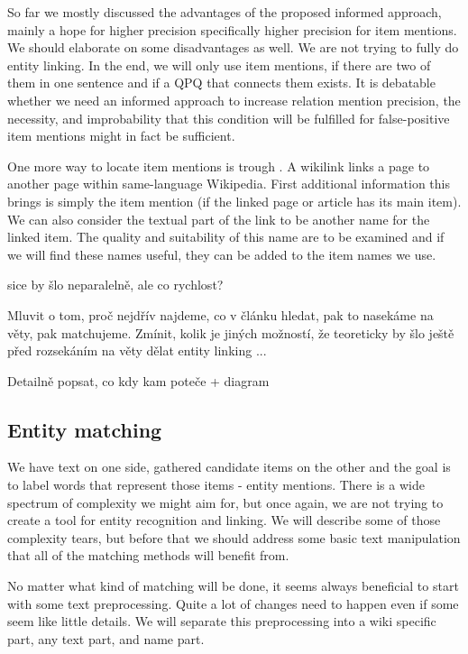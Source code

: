 So far we mostly discussed the advantages of the proposed informed approach, mainly a hope for higher precision specifically higher precision for item mentions. We should elaborate on some disadvantages as well. We are not trying to fully do entity linking. In the end, we will only use item mentions, if there are two of them in one sentence and if a QPQ that connects them exists. It is debatable whether we need an informed approach to increase relation mention precision, the necessity, and improbability that this condition will be fulfilled for false-positive item mentions might in fact be sufficient.

One more way to locate item mentions is trough . A wikilink links a page to another page within same-language Wikipedia. First additional information this brings is simply the item mention (if the linked page or article has its main item). We can also consider the textual part of the link to be another name for the linked item. The quality and suitability of this name are to be examined and if we will find these names useful, they can be added to the item names we use.



sice by šlo neparalelně, ale co rychlost?

Mluvit o tom, proč nejdřív najdeme, co v článku hledat, pak to nasekáme na věty, pak matchujeme. Zmínit, kolik je jiných možností, že teoreticky by šlo ještě před rozsekáním na věty dělat entity linking ...

Detailně popsat, co kdy kam poteče + diagram


\subsection{Entity matching}

We have text on one side, gathered candidate items on the other and the goal is to label words that represent those items - entity mentions. There is a wide spectrum of complexity we might aim for, but once again, we are not trying to create a tool for entity recognition and linking. We will describe some of those complexity tears, but before that we should address some basic text manipulation that all of the matching methods will benefit from.



No matter what kind of matching will be done, it seems always beneficial to start with some text preprocessing. Quite a lot of changes need to happen even if some seem like little details. We will separate this preprocessing into a wiki specific part, any text part, and name part. 


